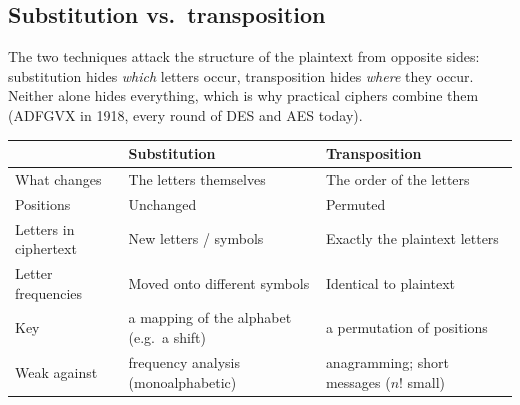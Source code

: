 \subsection{Substitution vs.\ transposition}
The two techniques attack the structure of the plaintext from opposite sides: substitution hides \emph{which} letters occur, transposition hides \emph{where} they occur. Neither alone hides everything, which is why practical ciphers combine them (ADFGVX in 1918, every round of DES and AES today).
\begin{center}\small
\begin{tabularx}{\textwidth}{@{}l X X@{}}
\toprule
 & \textbf{Substitution} & \textbf{Transposition} \\
\midrule
What changes & The letters themselves & The order of the letters \\
Positions & Unchanged & Permuted \\
Letters in ciphertext & New letters / symbols & Exactly the plaintext letters \\
Letter frequencies & Moved onto different symbols & Identical to plaintext \\
Key & a mapping of the alphabet (e.g.\ a shift) & a permutation of positions \\
Weak against & frequency analysis (monoalphabetic) & anagramming; short messages ($n!$ small) \\
\bottomrule
\end{tabularx}
\end{center}

\begin{center}
\end{center}

